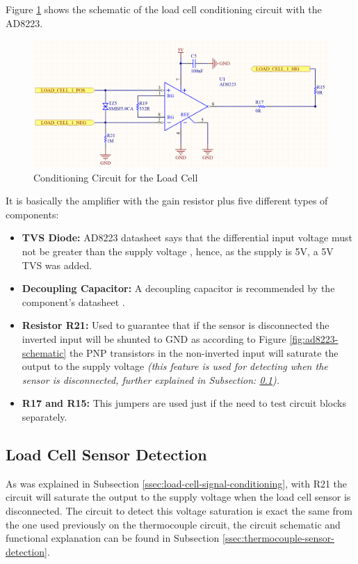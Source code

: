 		Figure \ref{fig:cic-cell} shows the schematic of the load cell conditioning circuit with the AD8223.

		\begin{figure}[htbp]
			\centering
				\includegraphics[scale=0.35]{figuras/fig-cic-cell.png}
			\caption{Conditioning Circuit for the Load Cell \cite{conditioning-circuit-for-the-load-cell}}
			\label{fig:cic-cell}
		\end{figure}

		It is basically the amplifier with the gain resistor plus five different types of components:
		\begin{itemize}
			\item \textbf{TVS Diode:} AD8223 datasheet says that the differential input voltage must not be greater than the supply voltage \cite{ad8223-datasheet}, hence, as the supply is 5V, a 5V TVS was added.
			\item \textbf{Decoupling Capacitor:} A decoupling capacitor is recommended by the component's datasheet \cite{ad8223-datasheet}.
			\item \textbf{Resistor R21:} Used to guarantee that if the sensor is disconnected the inverted input will be shunted to GND as according to Figure \ref{fig:ad8223-schematic} the PNP transistors in the non-inverted input will saturate the output to the supply voltage \textit{(this feature is used for detecting when the sensor is disconnected, further explained in Subsection: \ref{ssec:load-cell-sensor-detection}).}
			\item \textbf{R17 and R15:} This jumpers are used just if the need to test circuit blocks separately.
		\end{itemize}

\subsection{Load Cell Sensor Detection}\label{ssec:load-cell-sensor-detection}
	As was explained in Subsection \ref{ssec:load-cell-signal-conditioning}, with R21 the circuit will saturate the output to the supply voltage when the load cell sensor is disconnected. The circuit to detect this voltage saturation is exact the same from the one used previously on the thermocouple circuit, the circuit schematic and functional explanation can be found in Subsection \ref{ssec:thermocouple-sensor-detection}.

